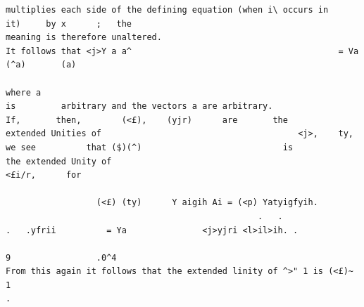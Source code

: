 \documentclass[10pt]{article}
\begin{document}
\begin{verbatim}
multiplies each side of the defining equation (when i\ occurs in                                                                                              it)     by x      ;   the
meaning is therefore unaltered.                                                   It follows that <j>Y a a^                                         = Va (^a)       (a)
                                                                                                                                                                          where a
is         arbitrary and the vectors a are arbitrary.                                                                          If,       then,        (<£),    (yjr)      are       the
extended Unities of                                       <j>,    ty,    we see          that ($)(^)                            is           the extended Unity of
<£i/r,      for

                  (<£) (ty)      Y aigih Ai = (<p) Yatyigfyih.
                                                  .   .                                       .   .yfrii          = Ya               <j>yjri <l>il>ih. .
                                                                                                                                            9                 .0^4
From this again it follows that the extended linity of ^>" 1 is (<£)~ 1                                                                                         .


\end{verbatim}
\clearpage
\end{document}
